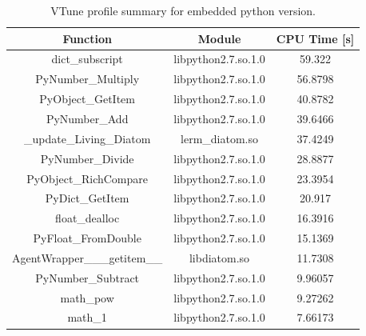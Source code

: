 \documentclass[12pt, a4paper]{report}
\begin{document}
\begin{table}
  \begin{center}
    \begin{tabular}{|c|c||c|}
    \hline
    Function                      & Module              & CPU Time [s]  \\ \hline
    \rowcolor{babyblue}
    dict\_subscript               & libpython2.7.so.1.0 & 59.322        \\
    \rowcolor{babyblue}
    PyNumber\_Multiply            & libpython2.7.so.1.0 & 56.8798       \\
    \rowcolor{babyblue}
    PyObject\_GetItem             & libpython2.7.so.1.0 & 40.8782       \\
    \rowcolor{babyblue}
    PyNumber\_Add                 & libpython2.7.so.1.0 & 39.6466       \\
    \_update\_Living\_Diatom      & lerm\_diatom.so     & 37.4249       \\
    \rowcolor{babyblue}
    PyNumber\_Divide              & libpython2.7.so.1.0 & 28.8877       \\
    \rowcolor{babyblue}
    PyObject\_RichCompare         & libpython2.7.so.1.0 & 23.3954       \\
    \rowcolor{babyblue}
    PyDict\_GetItem               & libpython2.7.so.1.0 & 20.917        \\
    \rowcolor{babyblue}
    float\_dealloc                & libpython2.7.so.1.0 & 16.3916       \\
    \rowcolor{babyblue}
    PyFloat\_FromDouble           & libpython2.7.so.1.0 & 15.1369       \\
    AgentWrapper\_\_\_getitem\_\_ & libdiatom.so        & 11.7308       \\
    \rowcolor{babyblue}
    PyNumber\_Subtract            & libpython2.7.so.1.0 & 9.96057       \\
    math\_pow                     & libpython2.7.so.1.0 & 9.27262       \\
    math\_1                       & libpython2.7.so.1.0 & 7.66173       \\ \hline
    \end{tabular}
    \caption {VTune profile summary for embedded python version.}
    \label{table:vtune-embedded-profile}
  \end{center}
\end{table}
\end{document}
